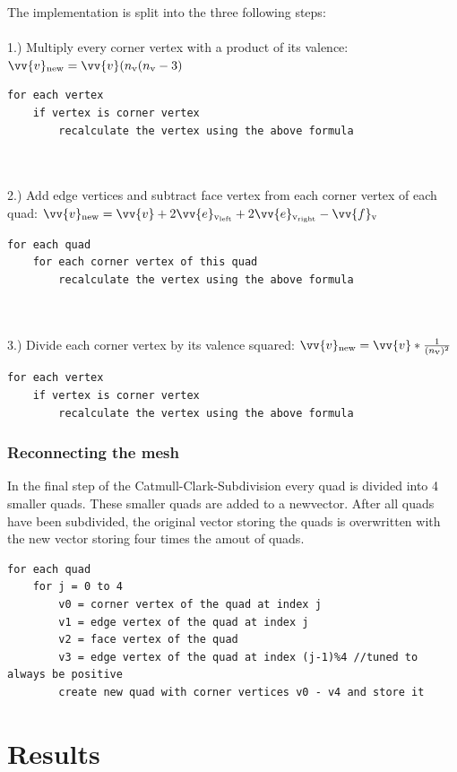 \documentclass[12pt,a4paper]{scrartcl}
\begin{document}
The implementation is split into the three following steps:\\
\ \\
1.) Multiply every corner vertex with a product of its valence: $ \vv{v}\textsubscript{new} = \vv{v} (n\textsubscript{v}(n\textsubscript{v}-3)$
\begin{lstlisting}[language=PSEUDO]
for each vertex
	if vertex is corner vertex
		recalculate the vertex using the above formula
\end{lstlisting}
\ \\
\ \\
2.) Add edge vertices and subtract face vertex from each corner vertex of each quad: $\vv{v}\textsubscript{new} = \vv{v} + 2 \vv{e}\textsubscript{v\textsubscript{left}} + 2 \vv{e}\textsubscript{v\textsubscript{right}} - \vv{f}\textsubscript{v}$
\begin{lstlisting}[language=PSEUDO]
for each quad
	for each corner vertex of this quad
		recalculate the vertex using the above formula
\end{lstlisting}
\ \\
\ \\
3.) Divide each corner vertex by its valence squared: $ \vv{v}\textsubscript{new} = \vv{v} * \frac{1}{(n\textsubscript{v})^{2}}$
\begin{lstlisting}[language=PSEUDO]
for each vertex
	if vertex is corner vertex
		recalculate the vertex using the above formula
\end{lstlisting}

\subsubsection{Reconnecting the mesh}
In the final step of the Catmull-Clark-Subdivision every quad is divided into 4 smaller quads. These smaller quads are added to a newvector. After all quads have been subdivided, the original vector storing the quads is overwritten with the new vector storing four times the amout of quads.
\begin{lstlisting}[language=PSEUDO]
for each quad
	for j = 0 to 4
		v0 = corner vertex of the quad at index j
		v1 = edge vertex of the quad at index j
		v2 = face vertex of the quad
		v3 = edge vertex of the quad at index (j-1)%4 //tuned to always be positive
		create new quad with corner vertices v0 - v4 and store it
\end{lstlisting}

\section{Results}
\end{document}
